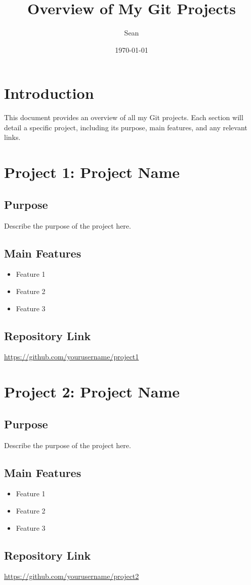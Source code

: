 \documentclass{article}
\title{Overview of My Git Projects}
\author{Sean}
\date{\today}
\begin{document}
\maketitle

\tableofcontents

\section{Introduction}
This document provides an overview of all my Git projects. Each section will detail a specific project, including its purpose, main features, and any relevant links.

\section{Project 1: Project Name}
\subsection{Purpose}
Describe the purpose of the project here.

\subsection{Main Features}
\begin{itemize}
    \item Feature 1
    \item Feature 2
    \item Feature 3
\end{itemize}

\subsection{Repository Link}
\url{https://github.com/yourusername/project1}

\section{Project 2: Project Name}
\subsection{Purpose}
Describe the purpose of the project here.

\subsection{Main Features}
\begin{itemize}
    \item Feature 1
    \item Feature 2
    \item Feature 3
\end{itemize}

\subsection{Repository Link}
\url{https://github.com/yourusername/project2}

\end{document}
